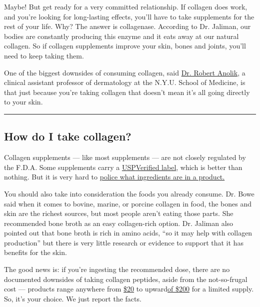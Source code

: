 Maybe! But get ready for a very committed relationship. If collagen does
work, and you're looking for long-lasting effects, you'll have to take
supplements for the rest of your life. Why? The answer is collagenase.
According to Dr. Jaliman, our bodies are constantly producing this
enzyme and it eats away at our natural collagen. So if collagen
supplements improve your skin, bones and joints, you'll need to keep
taking them.

One of the biggest downsides of consuming collagen, said
\href{https://www.charlottesbook.com/bookentries/robert-anolik-md/}{Dr.
Robert Anolik}, a clinical assistant professor of dermatology at the
N.Y.U. School of Medicine, is that just because you're taking collagen
that doesn't mean it's all going directly to your skin.

\begin{center}\rule{0.5\linewidth}{\linethickness}\end{center}

\hypertarget{how-do-i-take-collagen}{%
\subsection{How do I take collagen?}\label{how-do-i-take-collagen}}

Collagen supplements --- like most supplements --- are not closely
regulated by the F.D.A. Some supplements carry a
\href{https://well.blogs.nytimes.com/2015/02/12/107141/}{USP}\href{https://well.blogs.nytimes.com/2015/02/12/107141/}{Verified
label}, which is better than nothing. But it is very hard to
\href{https://www.consumerreports.org/supplements/how-to-choose-supplements-wisely/}{police
what ingredients are in a product.}

You should also take into consideration the foods you already consume.
Dr. Bowe said when it comes to bovine, marine, or porcine collagen in
food, the bones and skin are the richest sources, but most people aren't
eating those parts. She recommended bone broth as an easy collagen-rich
option. Dr. Jaliman also pointed out that bone broth is rich in amino
acids, ``so it may help with collagen production'' but there is very
little research or evidence to support that it has benefits for the
skin.

The good news is: if you're ingesting the recommended dose, there are no
documented downsides of taking collagen peptides, aside from the
not-so-frugal cost --- products range anywhere from
\href{https://www.sephora.com/product/collagen-peptides-P433638?gclsrc=aw.ds\&gclid=EAIaIQobChMI15qh8rqu3gIVkI7ICh1ibg3JEAYYAiABEgK_OvD_BwE\&skuId=2131589}{\$20}
to
upward\href{https://store.draxe.com/products/bone-broth-collagen-vanilla?variant=23863390341\&gclid=EAIaIQobChMIqPeMpqGu3gIVUVmGCh0jKw-kEAQYBCABEgLb8vD_BwE}{of
\$200} for a limited supply. So, it's your choice. We just report the
facts.

